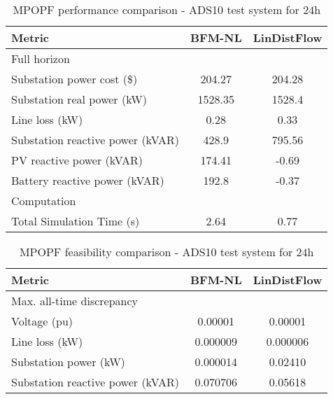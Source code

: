 \documentclass[../../outputs/main.tex]{subfiles}
\begin{document}
\begin{table}[t]
    \centering
    \caption{MPOPF performance comparison - ADS10 test system for $24$h}
    \begin{tabular}{|l|c|c|}
    \hline
    \textbf{Metric} & \textbf{BFM-NL} & \textbf{LinDistFlow} \\ \hline
    Full horizon  & \multicolumn{2}{c|}{} \\ \hline
    \quad Substation power cost (\$) & 204.27 & 204.28 \\ \hline
    \quad Substation real power (kW) & 1528.35 & 1528.4 \\ \hline
    \quad Line loss (kW) & 0.28 & 0.33 \\ \hline
    \quad Substation reactive power (kVAR) & 428.9 & 795.56 \\ \hline
    \quad PV reactive power (kVAR) & 174.41 & -0.69 \\ \hline
    \quad Battery reactive power (kVAR) & 192.8 & -0.37 \\ \hline
    Computation  & \multicolumn{2}{c|}{} \\ \hline
    \quad Total Simulation Time (s) & 2.64 & 0.77 \\ \hline
    \end{tabular}
    \label{table:mpopf-perf-ads10}
    \vspace{-3mm}
\end{table}

\begin{table}[t]
    \centering
    \caption{MPOPF feasibility comparison - ADS10 test system for $24$h}
    \begin{tabular}{|l|c|c|}
    \hline
    \textbf{Metric} & \textbf{BFM-NL} & \textbf{LinDistFlow} \\ \hline
    Max. all-time discrepancy & \multicolumn{2}{c|}{} \\ \hline
    \quad Voltage (pu) & 0.00001 & 0.00001 \\ \hline
    \quad Line loss (kW) & 0.000009 & 0.000006 \\ \hline
    \quad Substation power (kW) & 0.000014 & 0.02410 \\ \hline
    \quad Substation reactive power (kVAR) & 0.070706 & 0.05618 \\ \hline
    \end{tabular}
    \label{table:mpopf-feas-ads10}
    \vspace{-3mm}
\end{table}
\end{document}
